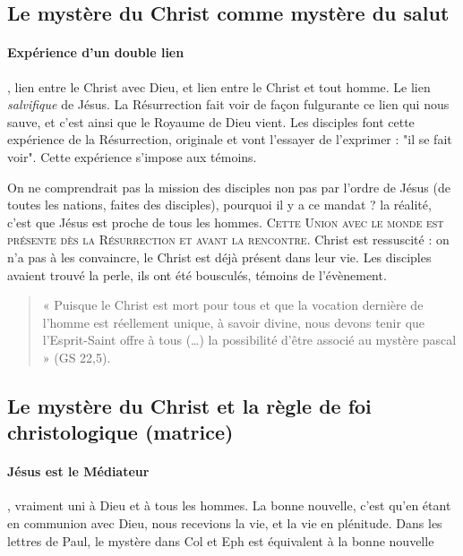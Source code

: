 \subsection{Le mystère du Christ comme mystère du salut}
    
    \paragraph{Expérience d'un double lien}, lien entre le Christ avec Dieu, et lien entre le Christ et tout homme. Le lien \textit{salvifique} de Jésus.
    La Résurrection fait voir de façon fulgurante ce lien qui nous sauve, et c'est ainsi que le Royaume de Dieu vient. Les disciples font cette expérience de la Résurrection, originale et vont l'essayer de l'exprimer : "il se fait voir".
    Cette expérience s'impose aux témoins. 
    
    On ne comprendrait pas la mission des disciples non pas par l'ordre de Jésus (de toutes les nations, faites des disciples), pourquoi il y a ce mandat ? la réalité, c'est que Jésus est proche de tous les hommes. \textsc{Cette Union avec le monde est présente dès la Résurrection et avant la rencontre}. Christ est ressuscité : on n'a pas à les convaincre, le Christ est déjà présent dans leur vie. Les disciples avaient trouvé la perle, ils ont été bousculés, témoins de l'évènement.
    
    \begin{quote}
            «  Puisque  le  Christ  est  mort  pour  tous  et  que  la  vocation  dernière  de  l’homme  est  réellement unique,  à  savoir  divine,  nous  devons  tenir  que  l’Esprit-Saint  offre  à  tous  (…)  la  possibilité d’être  associé  au mystère  pascal  »  (GS  22,5). 
    \end{quote}

     
  
    
\subsection{Le mystère du Christ et la règle de foi christologique
    (matrice)}
    
  
     \paragraph{Jésus est le Médiateur}, vraiment uni à Dieu et à tous les hommes. La bonne nouvelle, c'est qu'en étant en communion avec Dieu, nous recevions la vie, et la vie en plénitude. Dans les lettres de Paul, le mystère dans Col et Eph est équivalent à la bonne nouvelle
     

